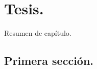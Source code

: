 \chapter{Tesis.}
\label{ch:proy}
Resumen de capítulo.

\section{Primera sección.}
	\label{sec:asdasd}



